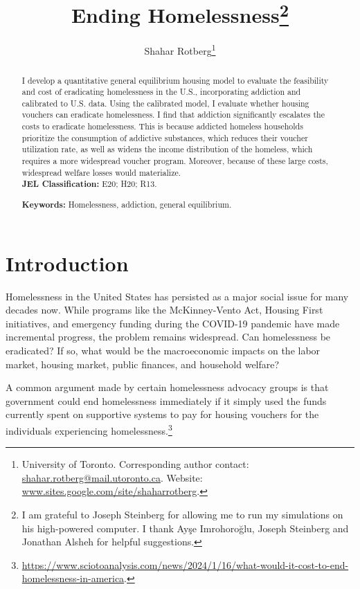 \documentclass[parskip=full]{article}
\title{\vspace{-1.8cm}Ending Homelessness\footnote{I am grateful to Joseph Steinberg for allowing me to run my simulations on his high-powered computer. I thank Ayşe Imrohoroğlu, Joseph Steinberg and Jonathan Alsheh for helpful suggestions.}}
\author{Shahar Rotberg\footnote{University of Toronto. Corresponding author contact: \url{shahar.rotberg@mail.utoronto.ca}. Website: \url{www.sites.google.com/site/shaharrotberg}.}}
\begin{document}
\maketitle

\begin{abstract}
\onehalfspacing
\noindent

\noindent I develop a quantitative general equilibrium housing model to evaluate the feasibility and cost of eradicating homelessness in the U.S., incorporating addiction and calibrated to U.S. data. Using the calibrated model, I evaluate whether housing vouchers can eradicate homelessness. I find that addiction significantly escalates the costs to eradicate homelessness. This is because addicted homeless households prioritize the consumption of addictive substances, which reduces their voucher utilization rate, as well as widens the income distribution of the homeless, which requires a more widespread voucher program. Moreover, because of these large costs, widespread welfare losses would materialize.
\\[1.5ex]

\noindent \textbf{JEL Classification:} E20; H20; R13. 

\noindent \textbf{Keywords:} Homelessness, addiction, general equilibrium.
\end{abstract}

\section{Introduction}

Homelessness in the United States has persisted as a major social issue for many decades now. While programs like the McKinney-Vento Act, Housing First initiatives, and emergency funding during the COVID-19 pandemic have made incremental progress, the problem remains widespread. Can homelessness be eradicated? If so, what would be the macroeconomic impacts on the labor market, housing market, public finances, and household welfare?

A common argument made by certain homelessness advocacy groups is that government could end homelessness immediately if it simply used the funds currently spent on supportive systems to pay for housing vouchers for the individuals experiencing homelessness.\footnote{\url{https://www.sciotoanalysis.com/news/2024/1/16/what-would-it-cost-to-end-homelessness-in-america}.}
\end{document}
